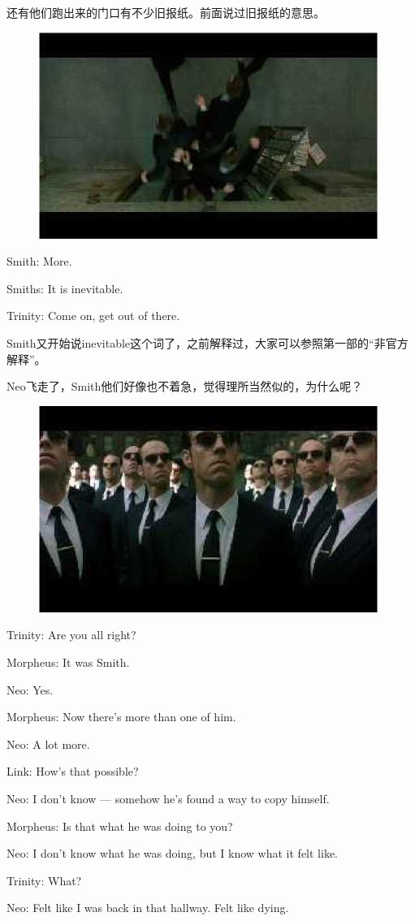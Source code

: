 \documentclass[UTF8]{ctexart}
\newenvironment{myquote}{\color{green} \setlength{\leftskip}{6em} \setlength{\rightskip}{4em} \setlength{\parindent}{-2em}}{\par}
\begin{document}
还有他们跑出来的门口有不少旧报纸。前面说过旧报纸的意思。

\begin{figure}[htb]
\centering
\includegraphics[width=0.5\linewidth]{fig/read_reloaded-79}
\end{figure}

\begin{myquote}
Smith: More.

Smiths: It is inevitable.

Trinity: Come on, get out of there.
\end{myquote}

Smith又开始说inevitable这个词了，之前解释过，大家可以参照第一部的“非官方解释”。

Neo飞走了，Smith他们好像也不着急，觉得理所当然似的，为什么呢？

\begin{figure}[htb]
\centering
\includegraphics[width=0.5\linewidth]{fig/read_reloaded-82}
\end{figure}

\begin{myquote}
Trinity: Are you all right?

Morpheus: It was Smith.

Neo: Yes.

Morpheus: Now there's more than one of him.

Neo: A lot more.

Link: How's that possible?

Neo: I don't know --- somehow he's found a way to copy himself.

Morpheus: Is that what he was doing to you?

Neo: I don't know what he was doing, but I know what it felt like.

Trinity: What?

Neo: Felt like I was back in that hallway. Felt like dying.
\end{myquote}
\end{document}
